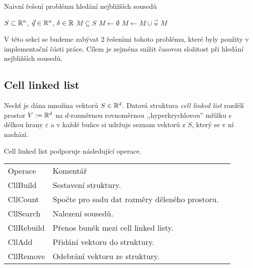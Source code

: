 \begin{algorithm}[ht!]
  \caption{Naivní řešení problému hledání nejbližších sousedů}
  \label{algo:naive-nns}
  \begin{algorithmic}
    \REQUIRE $S \subset \mathbb{R}^n$, $\vec{q} \in \mathbb{R}^n$, $\delta \in \mathbb{R}$
    \ENSURE $M \subseteq S$
    \STATE $M \leftarrow \emptyset$
          \STATE $M \leftarrow M \cup \vec{u}$
        \ENDIF
    \ENDFOR
    \RETURN $M$
  \end{algorithmic}
\end{algorithm}

V této sekci se budeme zabývat 2 řešeními tohoto problému, které byly použity v implementační části práce. Cílem je zejména snížit časovou složitost při hledání nejbližších sousedů.

\subsection{Cell linked list}

\label{defi:cll}
\begin{defi}
  Nechť je dána množina vektorů $S \in \mathbb{R}^d$. Datová struktura \textit{cell linked list} rozdělí prostor $V := \mathbb{R}^d$ na $d$-rozměrnou rovnoměrnou ,,hyperkrychlovou'' mřížku s délkou hrany $\varepsilon$ a v každé buňce si udržuje seznam vektorů z $S$, který se v ní nachází.\cite[s.~149--152]{computer_simulation_of_liquids}
\end{defi}

Cell linked list podporuje následující operace.

\begin{table}[ht!]
  \begin{tabular}{lll}
    Operace & Komentář\\
    CllBuild & Sestavení struktury.\\
    CllCount & Spočte pro sadu dat rozměry děleného prostoru.\\
    CllSearch & Nalezení sousedů.\\
    CllRebuild & Přenos buněk mezi cell linked listy.\\
    CllAdd & Přidání vektoru do struktury.\\
    CllRemove & Odebrání vektoru ze struktury.\\
  \end{tabular}
\end{table}

